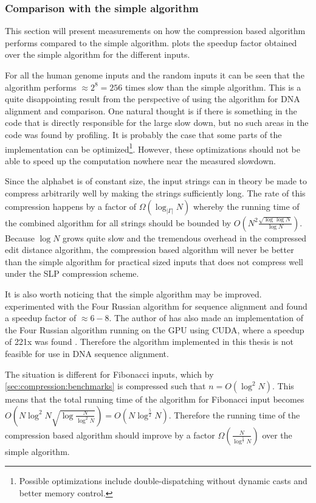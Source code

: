 \documentclass[twoside,11pt,openright]{report}
\begin{document}
\clearpage
\subsubsection{Comparison with the simple algorithm}
This section will present measurements on how the compression based algorithm performs compared to the simple algorithm.  plots the speedup factor obtained over the simple algorithm for the different inputs.

For all the human genome inputs and the random inputs it can be seen that the algorithm performs $\approx 2^{8} = 256$ times slow than the simple algorithm. This is a quite disappointing result from the perspective of using the algorithm for DNA alignment and comparison. One natural thought is if there is something in the code that is directly responsible for the large slow down, but no such areas in the code was found by profiling. It is probably the case that some parts of the implementation can be optimized\footnote{Possible optimizations include double-dispatching without dynamic casts and better memory control.}. However, these optimizations should not be able to speed up the computation nowhere near the measured slowdown.

Since the alphabet is of constant size, the input strings can in theory be made to compress arbitrarily well by making the strings sufficiently long. The rate of this compression happens by a factor of $\Omega(\log_{|\Gamma|}{N})$ whereby the running time of the combined algorithm for all strings should be bounded by $O\left( N^2 \frac{\sqrt{\log{\log{N}}}}{\log{N}} \right)$. Because $\log{N}$ grows quite slow and the tremendous overhead in the compressed edit distance algorithm, the compression based algorithm will never be better than the simple algorithm for practical sized inputs that does not compress well under the SLP compression scheme.

It is also worth noticing that the simple algorithm may be improved. \cite{LasseFourRussian} experimented with the Four Russian algorithm for sequence alignment and found a speedup factor of $\approx 6-8$. The author of \cite{LasseFourRussian} has also made an implementation of the Four Russian algorithm running on the GPU using CUDA, where a speedup of 221x was found \cite{LasseFourRussianCUDA}. Therefore the algorithm implemented in this thesis is not feasible for use in DNA sequence alignment.

The situation is different for Fibonacci inputs, which by \cref{sec:compression:benchmarks} is compressed such that $n = O(\log^2{N})$. This means that the total running time of the algorithm for Fibonacci input becomes $O\left( N\log^2{N} \sqrt{\log{\frac{N}{\log^2{N}}}} \right) = O(N\log^{\frac{5}{2}}{N})$. Therefore the running time of the compression based algorithm should improve by a factor $\Omega\left( \frac{N}{\log^{\frac{5}{2}}{N}} \right)$ over the simple algorithm.
\end{document}

